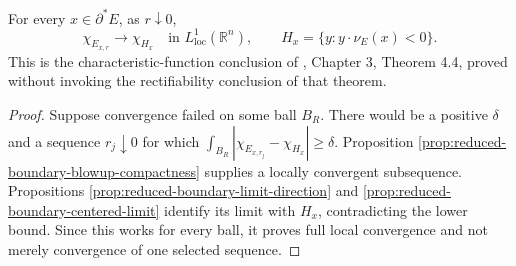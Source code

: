 \begin{theorem}\label{thm:reduced-boundary-full-blowup}
For every $x\in\partial^*E$, as $r\downarrow0$,
\[
 \chi_{E_{x,r}}\longrightarrow\chi_{H_x}
 \quad\text{in }L^1_{\mathrm{loc}}(\mathbb R^n),
 \qquad H_x=\{y:y\cdot\nu_E(x)<0\}.
\]
This is the characteristic-function conclusion of \cite{Sim18}, Chapter 3, Theorem 4.4, proved without invoking the rectifiability conclusion of that theorem.
\end{theorem}
\begin{proof}
Suppose convergence failed on some ball $B_R$. There would be a positive $\delta$ and a sequence $r_j\downarrow0$ for which $\int_{B_R}|\chi_{E_{x,r_j}}-\chi_{H_x}|\geq\delta$. Proposition \ref{prop:reduced-boundary-blowup-compactness} supplies a locally convergent subsequence. Propositions \ref{prop:reduced-boundary-limit-direction} and \ref{prop:reduced-boundary-centered-limit} identify its limit with $H_x$, contradicting the lower bound. Since this works for every ball, it proves full local convergence and not merely convergence of one selected sequence.
\end{proof}
